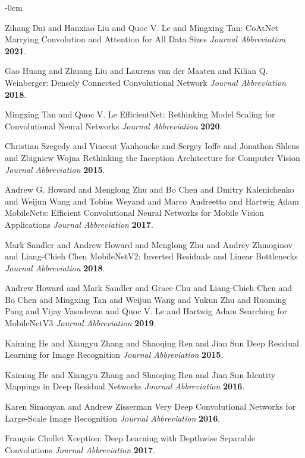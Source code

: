 \documentclass[sensors,article,submit,pdftex,moreauthors]{Definitions/mdpi}
\begin{document}
\begin{adjustwidth}{-\extralength}{0cm}
\begin{thebibliography}{999}
Zihang Dai and Hanxiao Liu and Quoc V. Le and Mingxing Tan: CoAtNet Marrying Convolution and Attention for All Data Sizes
{\em Journal Abbreviation} 
{\bf 2021}.

Gao Huang and Zhuang Liu and Laurens van der Maaten and Kilian Q. Weinberger: Densely Connected Convolutional Network
{\em Journal Abbreviation} 
{\bf 2018}.

Mingxing Tan and Quoc V. Le EfficientNet: Rethinking Model Scaling for Convolutional Neural Networks
{\em Journal Abbreviation} 
{\bf 2020}.

Christian Szegedy and Vincent Vanhoucke and Sergey Ioffe and Jonathon Shlens and Zbigniew Wojna Rethinking the Inception Architecture for Computer Vision
{\em Journal Abbreviation} 
{\bf 2015}.

Andrew G. Howard and Menglong Zhu and Bo Chen and Dmitry Kalenichenko and Weijun Wang and Tobias Weyand and Marco Andreetto and Hartwig Adam MobileNets: Efficient Convolutional Neural Networks for Mobile Vision Applications
{\em Journal Abbreviation} 
{\bf 2017}.

Mark Sandler and Andrew Howard and Menglong Zhu and Andrey Zhmoginov and Liang-Chieh Chen MobileNetV2: Inverted Residuals and Linear Bottlenecks
{\em Journal Abbreviation} 
{\bf 2018}.

Andrew Howard and Mark Sandler and Grace Chu and Liang-Chieh Chen and Bo Chen and Mingxing Tan and Weijun Wang and Yukun Zhu and Ruoming Pang and Vijay Vasudevan and Quoc V. Le and Hartwig Adam Searching for MobileNetV3
{\em Journal Abbreviation} 
{\bf 2019}.

Kaiming He and Xiangyu Zhang and Shaoqing Ren and Jian Sun Deep Residual Learning for Image Recognition
{\em Journal Abbreviation} 
{\bf 2015}.

Kaiming He and Xiangyu Zhang and Shaoqing Ren and Jian Sun Identity Mappings in Deep Residual Networks
{\em Journal Abbreviation} 
{\bf 2016}.

Karen Simonyan and Andrew Zisserman Very Deep Convolutional Networks for Large-Scale Image Recognition
{\em Journal Abbreviation} 
{\bf 2016}.

François Chollet Xception: Deep Learning with Depthwise Separable Convolutions
{\em Journal Abbreviation} 
{\bf 2017}.


\end{thebibliography}
\end{adjustwidth}
\end{document}

